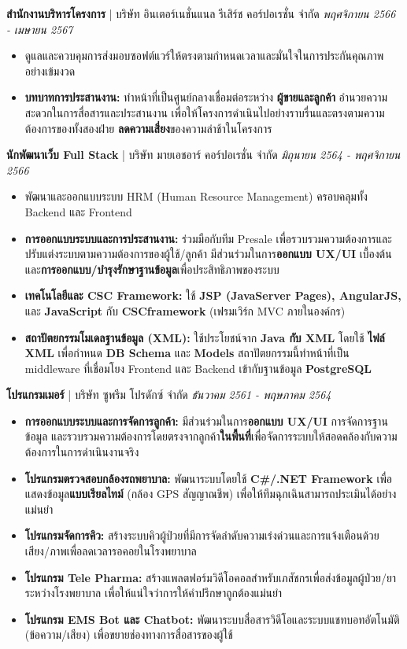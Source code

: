 \documentclass[11pt, a4paper]{article}
\newcommand{\jobentry}[3]{
    \vspace{0.7em} %
    \textbf{\color{black}#1} | #2 \hfill \emph{#3}
}
\begin{document}
\jobentry{สำนักงานบริหารโครงการ}{บริษัท อินเตอร์เนชั่นแนล รีเสิร์ช คอร์ปอเรชั่น จำกัด}{พฤศจิกายน 2566 - เมษายน 2567}
\begin{itemize}
    \item ดูแลและควบคุมการส่งมอบซอฟต์แวร์ให้ตรงตามกำหนดเวลาและมั่นใจในการประกันคุณภาพอย่างเข้มงวด
    \item \textbf{บทบาทการประสานงาน:} ทำหน้าที่เป็นศูนย์กลางเชื่อมต่อระหว่าง \textbf{ผู้ขายและลูกค้า} อำนวยความสะดวกในการสื่อสารและประสานงาน เพื่อให้โครงการดำเนินไปอย่างราบรื่นและตรงตามความต้องการของทั้งสองฝ่าย \textbf{ลดความเสี่ยง}ของความล่าช้าในโครงการ
\end{itemize}
\vspace{0.5em}

\jobentry{นักพัฒนาเว็บ Full Stack}{บริษัท มายเอชอาร์ คอร์ปอเรชั่น จำกัด}{มิถุนายน 2564 - พฤศจิกายน 2566}
\begin{itemize}
    \item พัฒนาและออกแบบระบบ HRM (Human Resource Management) ครอบคลุมทั้ง Backend และ Frontend
    \item \textbf{การออกแบบระบบและการประสานงาน:} ร่วมมือกับทีม Presale เพื่อรวบรวมความต้องการและปรับแต่งระบบตามความต้องการของผู้ใช้/ลูกค้า มีส่วนร่วมในการ\textbf{ออกแบบ UX/UI} เบื้องต้นและ\textbf{การออกแบบ/บำรุงรักษาฐานข้อมูล}เพื่อประสิทธิภาพของระบบ
    \item \textbf{เทคโนโลยีและ CSC Framework:} ใช้ \textbf{JSP (JavaServer Pages), AngularJS,} และ \textbf{JavaScript} กับ \textbf{CSCframework} (เฟรมเวิร์ก MVC ภายในองค์กร)
    \item \textbf{สถาปัตยกรรมโมเดลฐานข้อมูล (XML):} ใช้ประโยชน์จาก \textbf{Java กับ XML} โดยใช้ \textbf{ไฟล์ XML} เพื่อกำหนด \textbf{DB Schema} และ \textbf{Models} สถาปัตยกรรมนี้ทำหน้าที่เป็น middleware ที่เชื่อมโยง Frontend และ Backend เข้ากับฐานข้อมูล \textbf{PostgreSQL}
\end{itemize}
\vspace{0.5em}

\jobentry{โปรแกรมเมอร์}{บริษัท ซูพรีม โปรดักซ์ จำกัด}{ธันวาคม 2561 - พฤษภาคม 2564}
\begin{itemize}
    \item \textbf{การออกแบบระบบและการจัดการลูกค้า:} มีส่วนร่วมในการ\textbf{ออกแบบ UX/UI} การจัดการฐานข้อมูล และรวบรวมความต้องการโดยตรงจากลูกค้า\textbf{ในพื้นที่}เพื่อจัดการระบบให้สอดคล้องกับความต้องการในการดำเนินงานจริง
    \item \textbf{โปรแกรมตรวจสอบกล้องรถพยาบาล:} พัฒนาระบบโดยใช้ \textbf{C\#/.NET Framework} เพื่อแสดงข้อมูล\textbf{แบบเรียลไทม์} (กล้อง GPS สัญญาณชีพ) เพื่อให้ทีมฉุกเฉินสามารถประเมินได้อย่างแม่นยำ
    \item \textbf{โปรแกรมจัดการคิว:} สร้างระบบคิวผู้ป่วยที่มีการจัดลำดับความเร่งด่วนและการแจ้งเตือนด้วยเสียง/ภาพเพื่อลดเวลารอคอยในโรงพยาบาล
    \item \textbf{โปรแกรม Tele Pharma:} สร้างแพลตฟอร์มวิดีโอคอลสำหรับเภสัชกรเพื่อส่งข้อมูลผู้ป่วย/ยาระหว่างโรงพยาบาล เพื่อให้แน่ใจว่าการให้คำปรึกษาถูกต้องแม่นยำ
    \item \textbf{โปรแกรม EMS Bot และ Chatbot:} พัฒนาระบบสื่อสารวิดีโอและระบบแชทบอทอัตโนมัติ (ข้อความ/เสียง) เพื่อขยายช่องทางการสื่อสารของผู้ใช้
\end{itemize}
\vspace{0.5em}
\end{document}

